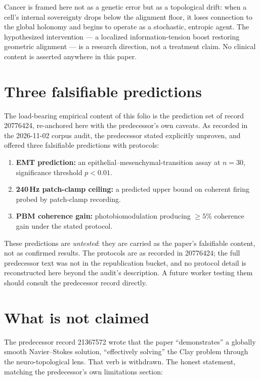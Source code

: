 \documentclass{alienfolio}
\begin{document}
 Cancer is framed here not as a genetic
error but as a topological drift: when a cell's internal sovereignty drops
below the alignment floor, it loses connection to the global holonomy and
begins to operate as a stochastic, entropic agent. The hypothesized
intervention --- a localized information-tension boost restoring geometric
alignment --- is a research direction, not a treatment claim. No clinical
content is asserted anywhere in this paper.

\section{Three falsifiable predictions}
The load-bearing empirical content of this folio is the prediction set of
record 20776424, re-anchored here with the predecessor's own caveats. As
recorded in the 2026-11-02 corpus audit, the predecessor stated
 explicitly unproven, and offered
three falsifiable predictions with protocols:

\begin{enumerate}
\item \textbf{EMT prediction:} an epithelial--mesenchymal-transition assay at
$n = 30$, significance threshold $p < 0.01$.
\item \textbf{240\,Hz patch-clamp ceiling:} a predicted upper bound on
coherent firing probed by patch-clamp recording.
\item \textbf{PBM coherence gain:} photobiomodulation producing $\geq 5\%$
coherence gain under the stated protocol.
\end{enumerate}

 These predictions are \emph{untested}: they are carried
as the paper's falsifiable content, not as confirmed results. The protocols
are as recorded in 20776424; the full predecessor text was not in the
republication bucket, and no protocol detail is reconstructed here beyond the
audit's description. A future worker testing them should consult the
predecessor record directly.

\section{What is not claimed}
The predecessor record 21367572 wrote that the paper ``demonstrates'' a
globally smooth Navier--Stokes solution, ``effectively solving'' the
Clay problem through the neuro-topological lens. That verb is withdrawn.
The honest statement, matching the predecessor's own limitations section:
\end{document}
